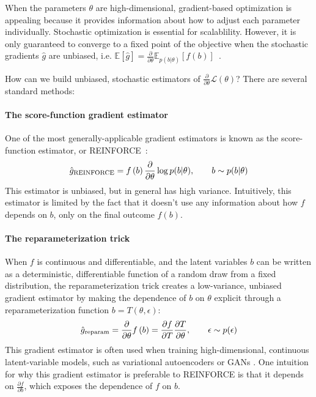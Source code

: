 \documentclass{article}
\newcommand{\PT}{\frac{\partial}{\partial \theta}}
\begin{document}
When the parameters $\theta$ are high-dimensional, gradient-based optimization is appealing because it provides information about how to adjust each parameter individually.
Stochastic optimization is essential for scalablility.
However, it is only guaranteed to converge to a fixed point of the objective when the stochastic gradients $\hat g$ are unbiased, i.e. ${\mathbb{E} \left[ \hat g \right] = \PT \mathbb{E}_{p(b|\theta)} \left[ f(b) \right]}$~\citep{robbins1951stochastic}.

How can we build unbiased, stochastic estimators of $\PT \mathcal{L}(\theta)$?
There are several standard methods:

\paragraph{The score-function gradient estimator}
One of the most generally-applicable gradient estimators is known as the score-function estimator, or REINFORCE~\citep{williams1992simple}:
%
\begin{align}
\hat g_\textnormal{REINFORCE} =  f \left( b \right) \PT \log p(b | \theta), \qquad b \sim p(b | \theta)
\end{align}
%
This estimator is unbiased, but in general has high variance.
Intuitively, this estimator is limited by the fact that it doesn't use any information about how $f$ depends on $b$, only on the final outcome $f(b)$.

\paragraph{The reparameterization trick}
When $f$ is continuous and differentiable, and the latent variables $b$ can be written as a deterministic, differentiable function of a random draw from a fixed distribution, the reparameterization trick \citep{williams1992simple, kingma2013autoencoding, rezende2014stochastic} creates a low-variance, unbiased gradient estimator by making the dependence of $b$ on $\theta$ explicit through a reparameterization function $b=T(\theta, \epsilon)$:
%
\begin{align}
\hat g_\textnormal{reparam}
= \PT f \left( b \right)
= \frac{\partial f}{\partial T}\frac{\partial T}{\partial \theta} , 
\qquad \epsilon \sim p(\epsilon) 
\end{align}
%
This gradient estimator is often used when training high-dimensional, continuous latent-variable models, such as variational autoencoders or GANs \citep{goodfellow2014generative}.
One intuition for why this gradient estimator is preferable to REINFORCE is that it depends on $\frac{\partial f}{\partial b}$, which exposes the dependence of $f$ on $b$.
\end{document}
